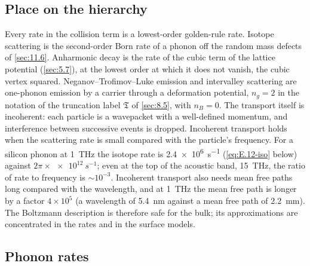 \subsection{Place on the hierarchy}

Every rate in the collision term is a lowest-order golden-rule rate. Isotope scattering is the second-order Born rate of a phonon off the random mass defects of \cref{sec:11.6}. Anharmonic decay is the rate of the cubic term of the lattice potential (\cref{sec:5.7}), at the lowest order at which it does not vanish, the cubic vertex squared. Neganov--Trofimov--Luke emission and intervalley scattering are one-phonon emission by a carrier through a deformation potential, $n_g = 2$ in the notation of the truncation label $\mathfrak{T}$ of \cref{sec:8.5}, with $n_B = 0$. The transport itself is incoherent: each particle is a wavepacket with a well-defined momentum, and interference between successive events is dropped. Incoherent transport holds when the scattering rate is small compared with the particle's frequency. For a silicon phonon at \SI{1}{THz} the isotope rate is \SI{2.4e6}{s^{-1}} (\cref{eq:E.12-iso} below) against $2\pi\times\SI{e12}{s^{-1}}$; even at the top of the acoustic band, \SI{15}{THz}, the ratio of rate to frequency is $\sim10^{-3}$. Incoherent transport also needs mean free paths long compared with the wavelength, and at \SI{1}{THz} the mean free path is longer by a factor $4\times10^5$ (a wavelength of \SI{5.4}{nm} against a mean free path of \SI{2.2}{mm}). The Boltzmann description is therefore safe for the bulk; its approximations are concentrated in the rates and in the surface models.

\subsection{Phonon rates}

